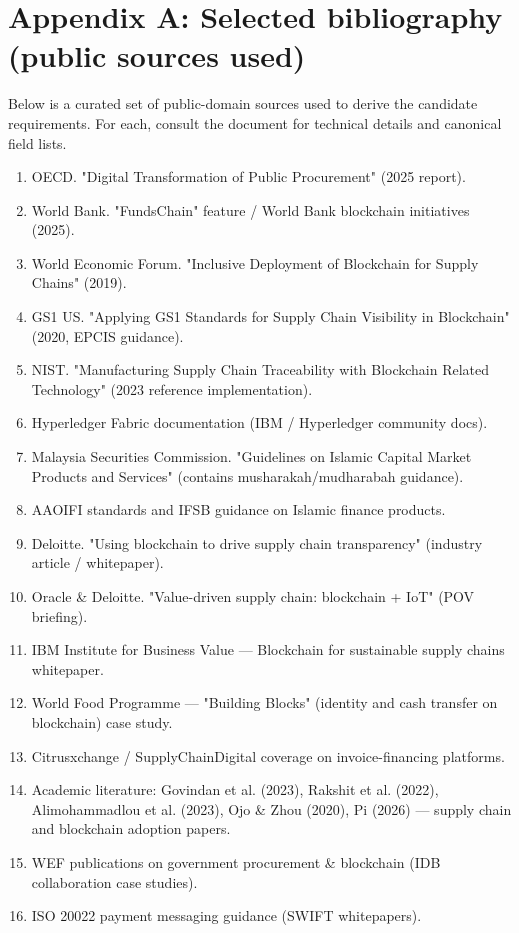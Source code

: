 \documentclass[11pt,a4paper]{article}
\begin{document}
\section{Appendix A: Selected bibliography (public sources used)}
Below is a curated set of public-domain sources used to derive the candidate requirements. For each, consult the document for technical details and canonical field lists.
\begin{enumerate}
\item OECD. "Digital Transformation of Public Procurement" (2025 report).
\item World Bank. "FundsChain" feature / World Bank blockchain initiatives (2025).
\item World Economic Forum. "Inclusive Deployment of Blockchain for Supply Chains" (2019).
\item GS1 US. "Applying GS1 Standards for Supply Chain Visibility in Blockchain" (2020, EPCIS guidance).
\item NIST. "Manufacturing Supply Chain Traceability with Blockchain Related Technology" (2023 reference implementation).
\item Hyperledger Fabric documentation (IBM / Hyperledger community docs).
\item Malaysia Securities Commission. "Guidelines on Islamic Capital Market Products and Services" (contains musharakah/mudharabah guidance).
\item AAOIFI standards and IFSB guidance on Islamic finance products.
\item Deloitte. "Using blockchain to drive supply chain transparency" (industry article / whitepaper).
\item Oracle \& Deloitte. "Value-driven supply chain: blockchain + IoT" (POV briefing).
\item IBM Institute for Business Value — Blockchain for sustainable supply chains whitepaper.
\item World Food Programme — "Building Blocks" (identity and cash transfer on blockchain) case study.
\item Citrusxchange / SupplyChainDigital coverage on invoice-financing platforms.
\item Academic literature: Govindan et al. (2023), Rakshit et al. (2022), Alimohammadlou et al. (2023), Ojo \& Zhou (2020), Pi (2026) — supply chain and blockchain adoption papers.
\item WEF publications on government procurement \& blockchain (IDB collaboration case studies).
\item ISO 20022 payment messaging guidance (SWIFT whitepapers).

\end{enumerate}
\end{document}
